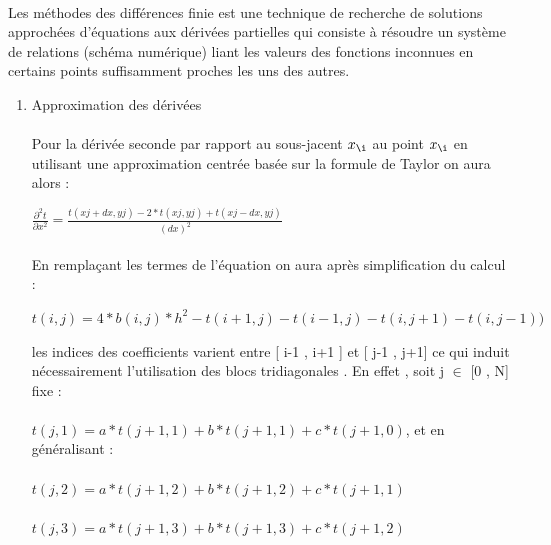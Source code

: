\documentclass{article}
\begin{document}
    \paragraph{} 
    Les méthodes des différences finie est une technique de recherche de solutions 
    approchées d’équations aux dérivées partielles qui consiste à résoudre un
    système de relations (schéma numérique) liant les valeurs des fonctions 
    inconnues en certains points suffisamment proches les uns des autres. 
   \begin{enumerate}
   	\item { Approximation des dérivées }
   	\paragraph{}
   
 	Pour la dérivée seconde par rapport au sous-jacent $ x_{\i}$ au point $ x_{\i}$ 
   en utilisant une approximation centrée basée sur la formule de Taylor  on aura alors : 
   	
   $	$$\frac{\partial^2 t}{\partial x^2}$$  = $$\frac{t( xj + dx , yj ) - 2*t( xj , yj ) + t( xj-dx , yj)}{(dx)^2 }$$ $ 
   
   \paragraph{}
   	En remplaçant les termes de l'équation %
   	on aura après simplification du calcul :
   	
   	$t ( i , j ) = 4 *b(i , j ) * h^2 - t(i+1 , j) - t(i-1 , j)-t(i , j+1)-t(i , j-1))$ 
   	
   	les indices des coefficients varient entre [ i-1 , i+1 ] et [ j-1 , j+1] 
   	ce qui induit nécessairement l'utilisation des blocs tridiagonales . En effet  , 
   	soit j $\in$ [0 , N] fixe :
   	\paragraph{}
   	
   	$t(j,1) = a*t(j+1 , 1) + b*t(j+1,1) + c*t(j+1,0)$, et en généralisant :
   	\paragraph{}
   	\iffalse
    $t(j,2) = a*t(j+1 , 2) + b*t(j+1,2) + c*t(j+1,1)$
    \paragraph{}
    $t(j,3) = a*t(j+1 , 3) + b*t(j+1,3) + c*t(j+1,2)$ 

\end{enumerate}
\end{document}
